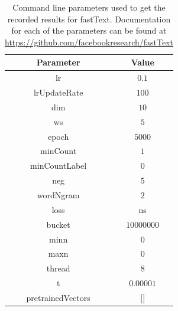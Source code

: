 \begin{table}[h!]
    \centering
    \begin{tabular}{ c | c }
    \textbf{Parameter} & \textbf{Value} \\ \hline \hline
    lr & $0.1$ \\ \hline
    lrUpdateRate & $100$ \\ \hline
    dim & $10$ \\ \hline
    ws & $5$ \\ \hline
    epoch & $5000$ \\ \hline
    minCount & $1$ \\ \hline
    minCountLabel & $0$ \\ \hline
    neg & $5$ \\ \hline
    wordNgram & $2$ \\ \hline
    loss & ns \\ \hline
    bucket & $10 000 000$ \\ \hline
    minn & $0$ \\ \hline
    maxn & $0$ \\ \hline
    thread & $8$ \\ \hline
    t & $0.00001$ \\ \hline
    pretrainedVectors & [] \\ \hline
    \end{tabular}
    \caption{Command line parameters used to get the recorded results for fastText. Documentation for each of the parameters can be found at \url{https://github.com/facebookresearch/fastText} }
    \label{table:fasttext-arg}
\end{table}

